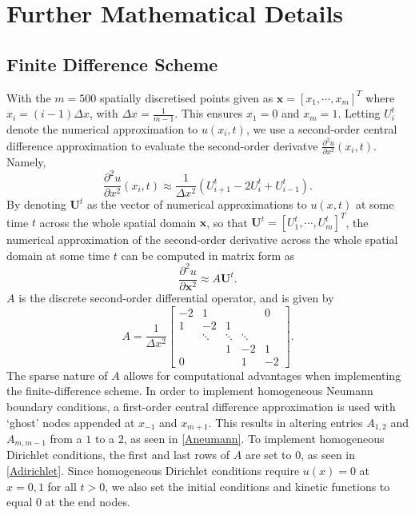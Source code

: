 \chapter{Further Mathematical Details}\label{section:appA}
\section{Finite Difference Scheme}
With the $m=500$ spatially discretised points given as $\textbf{x}=[x_1,\cdots,x_m]^T$ where $x_i=(i-1)\Delta x$, with $\Delta x=\frac{1}{m-1}$. This ensures $x_1=0$ and $x_m=1$. Letting $U_i^t$ denote the numerical approximation to $u(x_i,t)$, we use a second-order central difference approximation \cite{finitediff} to evaluate the second-order derivatve $\frac{\partial^2 u}{\partial x^2}(x_i,t)$. Namely,
\begin{equation}
\frac{\partial^2 u}{\partial x^2}(x_i,t)\approx\frac{1}{\Delta x^2}\left(U_{i+1}^t-2U_i^t+U_{i-1}^t\right).
\end{equation}
By denoting $\textbf{U}^t$ as the vector of numerical approximations to $u(x,t)$ at some time $t$ across the whole spatial domain $\textbf{x}$, so that $\textbf{U}^t=\left[U_1^t,\cdots,U_m^t\right]^T$, the numerical approximation of the second-order derivative across the whole spatial domain at some time $t$ can be computed in matrix form as
\begin{equation}
    \frac{\partial^2 u}{\partial \textbf{x}^2}\approx A\textbf{U}^t.
\end{equation}
$A$ is the discrete second-order differential operator, and is given by
\begin{equation}\label{A}
A=\frac{1}{\Delta x^2}\begin{bmatrix}
   -2&  1&  &  & 0\\
   1&  -2&  1&  & \\
   &  \ddots&  \ddots&  \ddots& \\
   &  &  1&  -2& 1\\
   0&  &  &  1& -2
  \end{bmatrix}.
\end{equation}
The sparse nature of $A$ allows for computational advantages when implementing the finite-difference scheme. In order to implement homogeneous Neumann boundary conditions, a first-order central difference approximation is used with `ghost' nodes appended at $x_{-1}$ and $x_{m+1}$. This results in altering entries $A_{1,2}$ and $A_{m,m-1}$ from a $1$ to a $2$, as seen in \eqref{Aneumann}. To implement homogeneous Dirichlet conditions, the first and last rows of $A$ are set to $0$, as seen in \eqref{Adirichlet}. Since homogeneous Dirichlet conditions require $u(x)=0$ at $x=0,1$ for all $t>0$, we also set the initial conditions and kinetic functions to equal $0$ at the end nodes.
